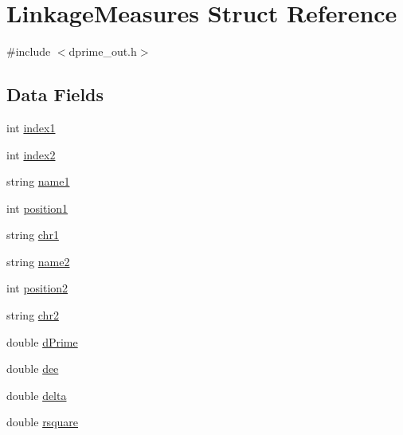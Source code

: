 \hypertarget{structLinkageMeasures}{
\section{LinkageMeasures Struct Reference}
\label{structLinkageMeasures}
}


{\ttfamily \#include $<$dprime\_\-out.h$>$}

\subsection*{Data Fields}
\begin{DoxyCompactItemize}
\item 
int \hyperlink{structLinkageMeasures_ab57aa7bdfae241b21d0bdf5a7152a1cb}{index1}
\item 
int \hyperlink{structLinkageMeasures_a8053871cc25e768322032d685d0df2e1}{index2}
\item 
string \hyperlink{structLinkageMeasures_a587496d80bc9a4969b2368d31cb62382}{name1}
\item 
int \hyperlink{structLinkageMeasures_a660cb54c0d3f1faa2469c9c4b29ce8bf}{position1}
\item 
string \hyperlink{structLinkageMeasures_a317b95a02ad0c8bbaed661ece5610474}{chr1}
\item 
string \hyperlink{structLinkageMeasures_a4c34092dbfb418d93fe1d3d9457ec39c}{name2}
\item 
int \hyperlink{structLinkageMeasures_a9f62eba5ae27930276ea222ade2927c0}{position2}
\item 
string \hyperlink{structLinkageMeasures_a8e7ed2e06d2a033c7b2d26cba6a36ccf}{chr2}
\item 
double \hyperlink{structLinkageMeasures_a79767d27cf40c91b7c7da1ac88b6bea4}{dPrime}
\item 
double \hyperlink{structLinkageMeasures_a746f64fda8dc472c187171dedc820286}{dee}
\item 
double \hyperlink{structLinkageMeasures_a25ac8ea745fdfd6a53badbc46c00f12c}{delta}
\item 
double \hyperlink{structLinkageMeasures_a11a1f44e1866dd30366bf44e753a9dfc}{rsquare}
\end{DoxyCompactItemize}


